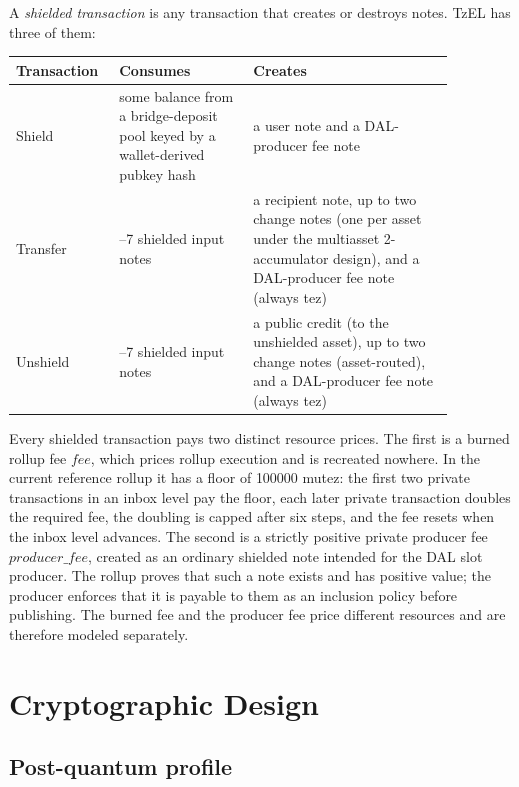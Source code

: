 \documentclass[11pt]{article}
\newcommand{\TzEL}{TzEL}
\begin{document}
A \emph{shielded transaction} is any transaction that creates or destroys notes.
\TzEL{} has three of them:

\begin{center}
\begin{tabular}{>{\raggedright\arraybackslash}p{0.17\linewidth} >{\raggedright\arraybackslash}p{0.28\linewidth} >{\raggedright\arraybackslash}p{0.42\linewidth}}
\toprule
Transaction & Consumes & Creates \\
\midrule
Shield & some balance from a bridge-deposit pool keyed by a wallet-derived pubkey hash & a user note and a DAL-producer fee note \\
Transfer & 1--7 shielded input notes & a recipient note, up to two change notes (one per asset under the multiasset 2-accumulator design), and a DAL-producer fee note (always tez) \\
Unshield & 1--7 shielded input notes & a public credit (to the unshielded asset), up to two change notes (asset-routed), and a DAL-producer fee note (always tez) \\
\bottomrule
\end{tabular}
\end{center}

Every shielded transaction pays two distinct resource prices. The first is a
burned rollup fee \(fee\), which prices rollup execution and is recreated
nowhere. In the current reference rollup it has a floor of 100000 mutez: the
first two private transactions in an inbox level pay the floor, each later
private transaction doubles the required fee, the doubling is capped after six
steps, and the fee resets when the inbox level advances. The second is a
strictly positive private producer fee \(producer\_fee\), created as an
ordinary shielded note intended for the DAL slot producer. The rollup proves
that such a note exists and has positive value; the producer enforces that it is
payable to them as an inclusion policy before publishing. The burned fee and the
producer fee price different resources and are therefore modeled separately.

\section{Cryptographic Design}

\subsection{Post-quantum profile}
\end{document}
